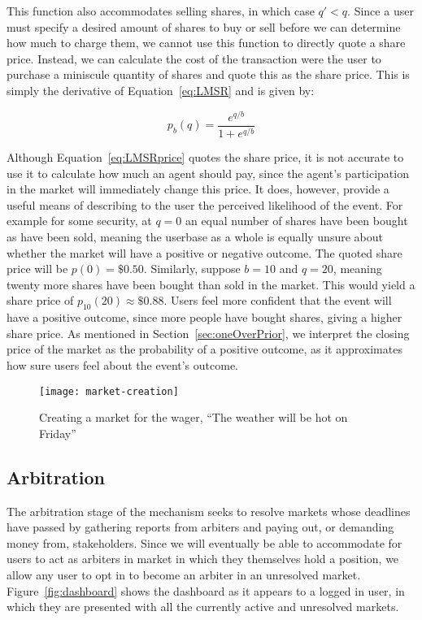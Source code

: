 This function also accommodates selling shares, in which case $q'<q$.  Since a
user must specify a desired amount of shares to buy or sell before we can
determine how much to charge them, we cannot use this function to directly
quote a share price. Instead, we can calculate the cost of the transaction were
the user to purchase a miniscule quantity of shares and quote this as the share
price. This is simply the derivative of Equation~\ref{eq:LMSR} and is given by:

\begin{equation}
	\label{eq:LMSRprice}
	p_b(q) = \frac{ e^{q/b} }{ 1 + e^{q/b} }
\end{equation}

Although Equation~\ref{eq:LMSRprice} quotes the share price, it is not accurate
to use it to calculate how much an agent should pay, since the agent's
participation in the market will immediately change this price. It does,
however, provide a useful means of describing to the user the perceived
likelihood of the event. For example for some security, at $q=0$ an equal
number of shares have been bought as have been sold, meaning the userbase as a
whole is equally unsure about whether the market will have a positive or
negative outcome. The quoted share price will be $p(0)=\$0.50$.  Similarly,
suppose $b=10$ and $q=20$, meaning twenty more shares have been bought than
sold in the market. This would yield a share price of $p_{10}(20) \approx
\$0.88$. Users feel more confident that the event will have a positive outcome,
since more people have bought shares, giving a higher share price. As mentioned
in Section~\ref{sec:oneOverPrior}, we interpret the closing price of the market
as the probability of a positive outcome, as it approximates how sure users
feel about the event's outcome.

\begin{figure}[h]
	\centering
	\texttt{[image: market-creation]}
	\caption{Creating a market for the wager, ``The weather will be hot on
	Friday''}
	\label{fig:marketCreation}
\end{figure}

\subsection{Arbitration}

\label{sec:arbitration}

The arbitration stage of the mechanism seeks to resolve markets whose deadlines
have passed by gathering reports from arbiters and paying out, or demanding
money from, stakeholders. Since we will eventually be able to accommodate for
users to act as arbiters in market in which they themselves hold a position, we
allow any user to opt in to become an arbiter in an unresolved market.
Figure~\ref{fig:dashboard} shows the dashboard as it appears to a logged in
user, in which they are presented with all the currently active and unresolved
markets. 

